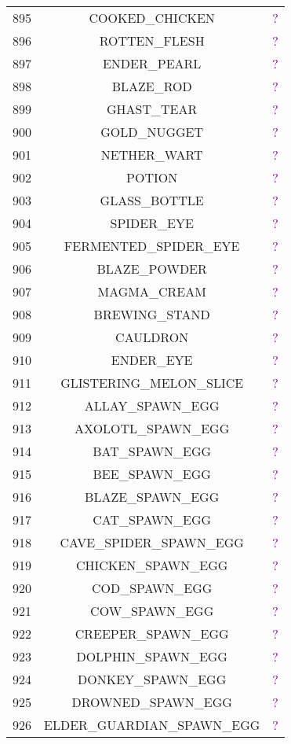 \documentclass[11pt]{article}
\newcommand\myworries[1]{\textcolor{purple}{#1}}
\begin{document}
\begin{longtable}{ |c|c|c| }
	895 & COOKED\_CHICKEN & \myworries{?} \\
	896 & ROTTEN\_FLESH & \myworries{?} \\
	897 & ENDER\_PEARL & \myworries{?} \\
	898 & BLAZE\_ROD & \myworries{?} \\
	899 & GHAST\_TEAR & \myworries{?} \\
	900 & GOLD\_NUGGET & \myworries{?} \\
	901 & NETHER\_WART & \myworries{?} \\
	902 & POTION & \myworries{?} \\
	903 & GLASS\_BOTTLE & \myworries{?} \\
	904 & SPIDER\_EYE & \myworries{?} \\
	905 & FERMENTED\_SPIDER\_EYE & \myworries{?} \\
	906 & BLAZE\_POWDER & \myworries{?} \\
	907 & MAGMA\_CREAM & \myworries{?} \\
	908 & BREWING\_STAND & \myworries{?} \\
	909 & CAULDRON & \myworries{?} \\
	910 & ENDER\_EYE & \myworries{?} \\
	911 & GLISTERING\_MELON\_SLICE & \myworries{?} \\
	912 & ALLAY\_SPAWN\_EGG & \myworries{?} \\
	913 & AXOLOTL\_SPAWN\_EGG & \myworries{?} \\
	914 & BAT\_SPAWN\_EGG & \myworries{?} \\
	915 & BEE\_SPAWN\_EGG & \myworries{?} \\
	916 & BLAZE\_SPAWN\_EGG & \myworries{?} \\
	917 & CAT\_SPAWN\_EGG & \myworries{?} \\
	918 & CAVE\_SPIDER\_SPAWN\_EGG & \myworries{?} \\
	919 & CHICKEN\_SPAWN\_EGG & \myworries{?} \\
	920 & COD\_SPAWN\_EGG & \myworries{?} \\
	921 & COW\_SPAWN\_EGG & \myworries{?} \\
	922 & CREEPER\_SPAWN\_EGG & \myworries{?} \\
	923 & DOLPHIN\_SPAWN\_EGG & \myworries{?} \\
	924 & DONKEY\_SPAWN\_EGG & \myworries{?} \\
	925 & DROWNED\_SPAWN\_EGG & \myworries{?} \\
	926 & ELDER\_GUARDIAN\_SPAWN\_EGG & \myworries{?} \\

\end{longtable}
\end{document}
